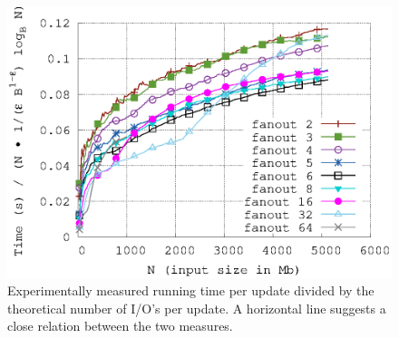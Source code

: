 \documentclass[twoside,11pt,openright]{report}
\begin{document}
\begin{figure}[h]
\begin{minipage}[t]{0.48\columnwidth}
  \label{fig:gerth_fanout_experiment_ios_divided_asymptotic}
\end{minipage}
\hfill
\begin{minipage}[t]{0.48\columnwidth}
  \centering
  \includegraphics[width=\linewidth]{../src/experiments/gerth_fanout_experiment_results/2016-05-06.11_52_24/time_divided_asymptotic}
  \caption{Experimentally measured running time per update divided by the theoretical number of I/O's per update. A horizontal line suggests a close relation between the two measures.}
  \label{fig:gerth_fanout_experiment_time_divided_asymptotic}
\end{minipage}
\end{figure}
\end{document}
